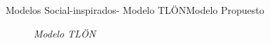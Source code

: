 \begin{frame}{Modelos Social-inspirados- Modelo TLÖN}{Modelo Propuesto}
    \begin{figure}				
		\caption{\small \sl Modelo TLÖN}
		\label{figure:TLON}
    \end{figure}
\end{frame}
